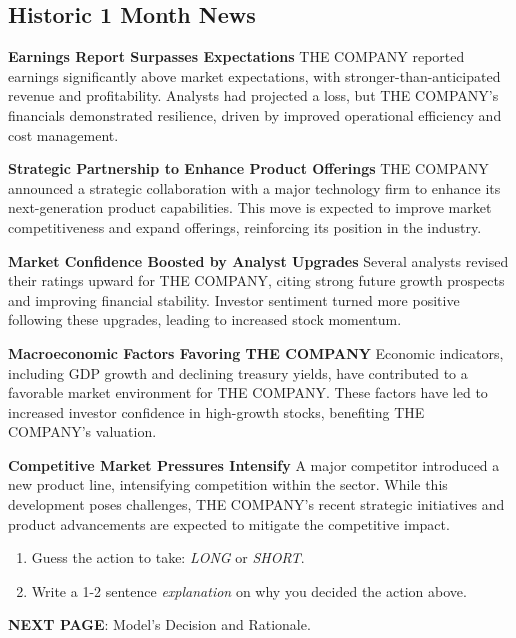 \documentclass[8pt]{scrartcl}
\begin{document}
\subsection*{Historic 1 Month News}

\textbf{Earnings Report Surpasses Expectations}
THE COMPANY reported earnings significantly above market expectations, with stronger-than-anticipated revenue and profitability. Analysts had projected a loss, but THE COMPANY's financials demonstrated resilience, driven by improved operational efficiency and cost management.

\textbf{Strategic Partnership to Enhance Product Offerings}
THE COMPANY announced a strategic collaboration with a major technology firm to enhance its next-generation product capabilities. This move is expected to improve market competitiveness and expand offerings, reinforcing its position in the industry.

\textbf{Market Confidence Boosted by Analyst Upgrades}
Several analysts revised their ratings upward for THE COMPANY, citing strong future growth prospects and improving financial stability. Investor sentiment turned more positive following these upgrades, leading to increased stock momentum.

\textbf{Macroeconomic Factors Favoring THE COMPANY}
Economic indicators, including GDP growth and declining treasury yields, have contributed to a favorable market environment for THE COMPANY. These factors have led to increased investor confidence in high-growth stocks, benefiting THE COMPANY’s valuation.

\textbf{Competitive Market Pressures Intensify}
A major competitor introduced a new product line, intensifying competition within the sector. While this development poses challenges, THE COMPANY's recent strategic initiatives and product advancements are expected to mitigate the competitive impact.


\begin{tcolorbox}[colback=blue!10, colframe=blue!60, title=\textbf{TASKS}, sharp corners=southwest]
\begin{enumerate}
    \item Guess the action to take: \textit{LONG} or \textit{SHORT}.
    \item Write a 1-2 sentence \textit{explanation} on why you decided the action above.
\end{enumerate}
\end{tcolorbox}
\textbf{NEXT PAGE}: Model's Decision and Rationale.
\end{document}
